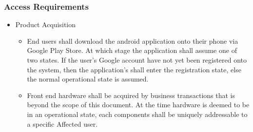 \subsubsection{Access Requirements}
\begin{itemize}
	\item{Product Acquisition}
	\begin{itemize}
		\item End users shall download the android application onto their phone via Google Play Store. At which stage the application shall assume one of two states.
		If the user's Google account have not yet been registered onto the system, then the application's shall enter the registration state, else the normal operational state is assumed.
		\item Front end hardware shall be acquired by business transactions that is beyond the scope of this document. At the time hardware is deemed to be in an operational state, each components shall be uniquely addressable to a specific Affected user.
	\end{itemize}
	

\end{itemize}

